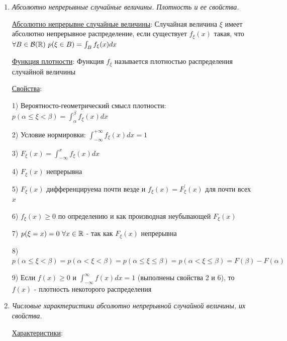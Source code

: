 \documentclass[12pt]{article}
\begin{document}
\begin{enumerate}
    7) Если функция распределения непрерывна в точке $x = x_0$, то очевидно, что вероятность попадания в эту точка $p(\xi = x_0) = 0$ (следствие из 6 пункта)
    
    8) Если $F(x)$ непрерывна $\forall x \in \Real$, то $p(\alpha \leq \xi < \beta) = p(\alpha < \xi < \beta) = p(\alpha \leq \xi \leq \beta) = p(\alpha < \xi \leq \beta) = F(\beta) - F(\alpha)$
    
    \item \textit{Абсолютно непрерывные случайные величины. Плотность и ее свойства.}

    \hyperlink{continuousdistributionproperties}{Абсолютно непрерывне случайные величины}: Случайная величина $\xi$ имеет абсолютно непрерывное распределение, если существует $f_\xi(x)$ такая, что $\forall B \in \mathcal{B}(\mathbb{R})
    \ p(\xi \in B) = \int_B f_\xi(x)dx$

    \hyperlink{densityfunctiondefinition}{Функция плотности}: Функция $f_\xi$ называется плотностью распределения случайной величины

    \hyperlink{densityfunctionproperties}{Свойства}:

    1) Вероятносто-геометрический смысл плотности: $p(\alpha \leq \xi < \beta) = \int_{\alpha}^\beta f_\xi(x) dx$

    2) Условие нормировки: $\int_{-\infty}^{+\infty} f_\xi(x)dx = 1$

    3) $F_\xi(x) = \int_{-\infty}^x f_\xi(x)dx$

    4) $F_\xi(x)$ непрерывна 

    5) $F_\xi(x)$ дифференцируема почти везде и $f_\xi(x) = F^\prime_\xi(x)$ для почти всех $x$

    6) $f_\xi(x) \geq 0$ по определению и как производная неубывающей $F_\xi(x)$

    7) $p(\xi = x) = 0 \ \forall x \in \mathbb{R}$ - так как $F_\xi(x)$ непрерывна

    8) $p(\alpha \leq \xi < \beta) = p(\alpha < \xi < \beta) = p(\alpha \leq \xi \leq \beta) = p(\alpha < \xi \leq \beta) = F(\beta) - F(\alpha)$

    9) \Ths Если $f(x) \geq 0$ и $\int_{-\infty}^{\infty} f(x)dx = 1$ (выполнены свойства 2 и 6), то $f(x)$ - плотность некоторого распределения

    \item \textit{Числовые характеристики абсолютно непрерывной случайной величины, их свойства.}

    \hyperlink{attributesofcontinuousrandomvariable}{Характеристики}:


\end{enumerate}
\end{document}
